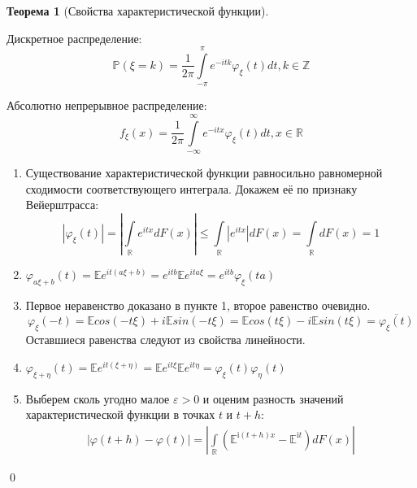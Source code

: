 \documentclass[oneside,final,14pt]{extreport}
\renewenvironment{proof}{{\bfseries Доказательство.}}{\qed}
\theoremstyle{plain}
\theoremstyle{definition}
\theoremstyle{named}
\newtheorem*{namedthm}{Теорема}
\begin{document}
\begin{namedthm}[Свойства характеристической функции]
\begin{enumerate}
        Дискретное распределение:
        \begin{equation*}
            \mathbb{P}(\xi=k)=\frac{1}{2 \pi} \int\limits_{-\pi}^{\pi} e^{-i t k} \varphi_{\xi}(t) d t, k \in \mathbb{Z}
        \end{equation*}
        
        Абсолютно непрерывное распределение:
        \begin{equation*}
            f_{\xi}(x)=\frac{1}{2 \pi} \int\limits_{-\infty}^{\infty} e^{-i t x} \varphi_{\xi}(t) d t, x \in \mathbb{R}
        \end{equation*}
    \end{enumerate}
\end{namedthm}

\begin{proof}
    \begin{enumerate}
        \item Существование характеристической функции равносильно равномерной сходимости соответствующего интеграла. Докажем её по признаку Вейерштрасса:
        \begin{equation*}
            \left|\varphi_{\xi}(t)\right|=\left|\int\limits_{\mathbb{R}} e^{i t x} d F(x)\right| \leqslant \int\limits_{\mathbb{R}}\left|e^{i t x}\right| d F(x)=\int\limits_{\mathbb{R}} d F(x)=1
        \end{equation*}
        \item $\varphi_{a \xi+b}(t) 
        = \mathbb{E}e^{i t(a \xi+b)}
        = e^{i t b} \mathbb{E}e^{i t a \xi}
        = e^{i t b} \varphi_{\xi}(t a)$
        \item Первое неравенство доказано в пункте 1, второе равенство очевидно.
        \begin{equation*}
            \varphi_{\xi}(-t) = \mathbb{E}cos(-t \xi) + i\mathbb{E}sin(-t \xi) = \mathbb{E}cos(t \xi) - i\mathbb{E}sin(t \xi) = \overline{\varphi_{\xi}(t)}
        \end{equation*}
        Оставшиеся равенства следуют из свойства линейности.
        \item $\varphi_{\xi + \eta}(t) 
        = \mathbb{E}e^{it(\xi + \eta)} 
        = \mathbb{E}e^{it\xi}\mathbb{E}e^{it\eta}
        = \varphi_{\xi}(t)\varphi_{\eta}(t)$
        \item Выберем сколь угодно малое $\varepsilon > 0$ и оценим разность значений характеристической функции в точках $t$ и $t + h$:
        \begin{multline*}
            |\varphi(t+h)-\varphi(t)| 
            = \left|\int\limits_{\mathbb{R}} \left(\mathbb{E}^{\mathrm{i}(t+h) x}-\mathbb{E}^{\mathrm{i} t}\right) d F(x)\right|

\end{multline*}
\end{enumerate}
\end{proof}
\end{document}
